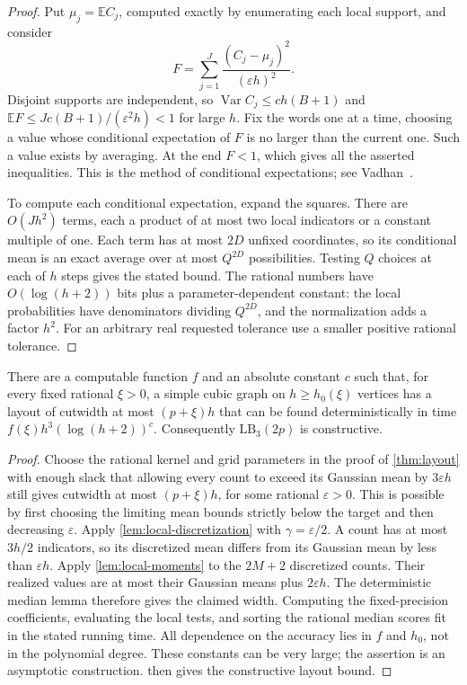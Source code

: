 \documentclass[11pt]{article}
\theoremstyle{plain}
\theoremstyle{definition}
\theoremstyle{remark}
\newcommand{\LB}{\mathrm{LB}}
\begin{document}
\begin{proof}
Put $\mu_j=\mathbb E C_j$, computed exactly by enumerating each local support, and consider
\[
  F=\sum_{j=1}^J\frac{(C_j-\mu_j)^2}{(\varepsilon h)^2}.
\]
Disjoint supports are independent, so $\operatorname{Var} C_j\le ch(B+1)$ and
$\mathbb E F\le Jc(B+1)/(\varepsilon^2h)<1$ for large $h$. Fix the words one at a time,
choosing a value whose conditional expectation of $F$ is no larger than the current one.
Such a value exists by averaging. At the end $F<1$, which gives all the asserted inequalities.
This is the method of conditional expectations; see Vadhan~\cite[Section~3.4]{Vadhan2012}.

To compute each conditional expectation, expand the squares. There are $O(Jh^2)$ terms,
each a product of at most two local indicators or a constant multiple of one. Each term has
at most $2D$ unfixed coordinates, so its conditional mean is an exact average over at most
$Q^{2D}$ possibilities. Testing $Q$ choices at each of $h$ steps gives the stated bound.
The rational numbers have $O(\log(h+2))$ bits plus a parameter-dependent constant: the local
probabilities have denominators dividing $Q^{2D}$, and the normalization adds a factor $h^2$.
For an arbitrary real requested tolerance use a smaller positive rational tolerance.
\end{proof}

\begin{lemma}
\label{lem:derandomization}
There are a computable function $f$ and an absolute constant $c$ such that, for every fixed
rational $\xi>0$, a simple cubic graph on $h\ge h_0(\xi)$ vertices has a layout of cutwidth
at most $(p+\xi)h$ that can be found deterministically in time
$f(\xi)h^3(\log(h+2))^c$. Consequently $\LB_3(2p)$ is constructive.
\end{lemma}

\begin{proof}
Choose the rational kernel and grid parameters in the proof of \cref{thm:layout} with enough
slack that allowing every count to exceed its Gaussian mean by $3\varepsilon h$ still gives
cutwidth at most $(p+\xi)h$, for some rational $\varepsilon>0$. This is possible by first
choosing the limiting mean bounds strictly below the target and then decreasing $\varepsilon$.
Apply \cref{lem:local-discretization} with $\gamma=\varepsilon/2$. A count has at most $3h/2$
indicators, so its discretized mean differs from its Gaussian mean by less than $\varepsilon h$.
Apply \cref{lem:local-moments} to the $2M+2$ discretized counts. Their realized values are at
most their Gaussian means plus $2\varepsilon h$. The deterministic median lemma therefore
gives the claimed width. Computing the fixed-precision coefficients, evaluating the local
tests, and sorting the rational median scores fit in the stated running time. All dependence
on the accuracy lies in $f$ and $h_0$, not in the polynomial degree. These constants can be very
large; the assertion is an asymptotic construction. 
then gives the constructive layout bound.
\end{proof}
\end{document}
